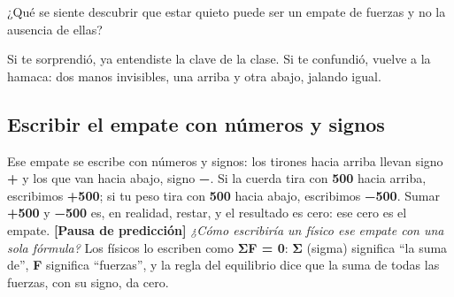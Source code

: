 \documentclass[
  spanish,
  letterpaper,
  12pt,
  oneside,
  open=any,
  DIV=15]{scrbook}
\begin{document}
\begin{tcolorbox}[enhanced jigsaw, arc=.35mm, bottomrule=.15mm, bottomtitle=1mm, breakable, colback=white, colbacktitle=quarto-callout-note-color!10!white, colframe=quarto-callout-note-color-frame, coltitle=black, left=2mm, leftrule=.75mm, opacityback=0, opacitybacktitle=0.6, rightrule=.15mm, title=\textcolor{quarto-callout-note-color}{\faInfo}\hspace{0.5em}{Pregunta socioemocional}, titlerule=0mm, toprule=.15mm, toptitle=1mm]

¿Qué se siente descubrir que estar quieto puede ser un empate de fuerzas
y no la ausencia de ellas?

\end{tcolorbox}

\begin{tcolorbox}[enhanced jigsaw, arc=.35mm, bottomrule=.15mm, bottomtitle=1mm, breakable, colback=white, colbacktitle=quarto-callout-tip-color!10!white, colframe=quarto-callout-tip-color-frame, coltitle=black, left=2mm, leftrule=.75mm, opacityback=0, opacitybacktitle=0.6, rightrule=.15mm, title=\textcolor{quarto-callout-tip-color}{\faLightbulb}\hspace{0.5em}{Sobre la pregunta socioemocional}, titlerule=0mm, toprule=.15mm, toptitle=1mm]

Si te sorprendió, ya entendiste la clave de la clase. Si te confundió,
vuelve a la hamaca: dos manos invisibles, una arriba y otra abajo,
jalando igual.

\end{tcolorbox}

\subsection{Escribir el empate con números y
signos}\label{escribir-el-empate-con-nuxfameros-y-signos}

Ese empate se escribe con números y signos: los tirones hacia arriba
llevan signo \textcolor[HTML]{7C3AED}{\textbf{+}} y los que van hacia
abajo, signo \textcolor[HTML]{2563EB}{\textbf{−}}. Si la cuerda tira con
\textcolor[HTML]{7C3AED}{\textbf{500}} hacia arriba, escribimos
\textcolor[HTML]{7C3AED}{\textbf{+500}}; si tu peso tira con
\textcolor[HTML]{2563EB}{\textbf{500}} hacia abajo, escribimos
\textcolor[HTML]{2563EB}{\textbf{−500}}. Sumar
\textcolor[HTML]{7C3AED}{\textbf{+500}} y
\textcolor[HTML]{2563EB}{\textbf{−500}} es, en realidad, restar, y el
resultado es cero: ese cero es el empate. \textbf{{[}Pausa de
predicción{]}} \emph{¿Cómo escribiría un físico ese empate con una sola
fórmula?} Los físicos lo escriben como \textbf{ΣF = 0}: \textbf{Σ}
(sigma) significa ``la suma de'', \textbf{F} significa ``fuerzas'', y la
regla del equilibrio dice que la suma de todas las fuerzas, con su
signo, da cero.
\end{document}
